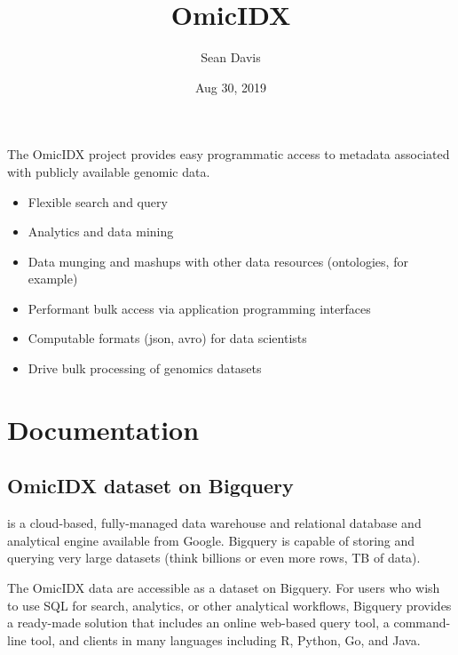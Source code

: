 \documentclass[letterpaper,10pt,english]{sphinxmanual}
\title{OmicIDX}
\date{Aug 30, 2019}
\author{Sean Davis}
\begin{document}
\pagestyle{empty}
\sphinxmaketitle
\pagestyle{plain}
\sphinxtableofcontents
\pagestyle{normal}
\label{\detokenize{index::doc}}


The OmicIDX project provides easy programmatic access to metadata
associated with publicly available genomic data.
\begin{itemize}
\item {} 
Flexible search and query

\item {} 
Analytics and data mining

\item {} 
Data munging and mashups with other data resources (ontologies, for example)

\item {} 
Performant bulk access via application programming interfaces

\item {} 
Computable formats (json, avro) for data scientists

\item {} 
Drive bulk processing of genomics datasets

\end{itemize}


\chapter{Documentation}
\label{\detokenize{index:documentation}}

\section{OmicIDX dataset on Bigquery}
\label{\detokenize{Bigquery:omicidx-dataset-on-bigquery}}\label{\detokenize{Bigquery::doc}}
 is a cloud-based, fully-managed data warehouse and
relational database and analytical engine available from
Google. Bigquery is capable of storing and querying very large
datasets (think billions or even more rows, TB of data).

The OmicIDX data are accessible as a  dataset on
Bigquery. For users who wish to use SQL for search, analytics, or
other analytical workflows, Bigquery provides a ready-made solution
that includes an online web-based query tool, a command-line tool, and
clients in many languages including R, Python, Go, and Java.
\end{document}
